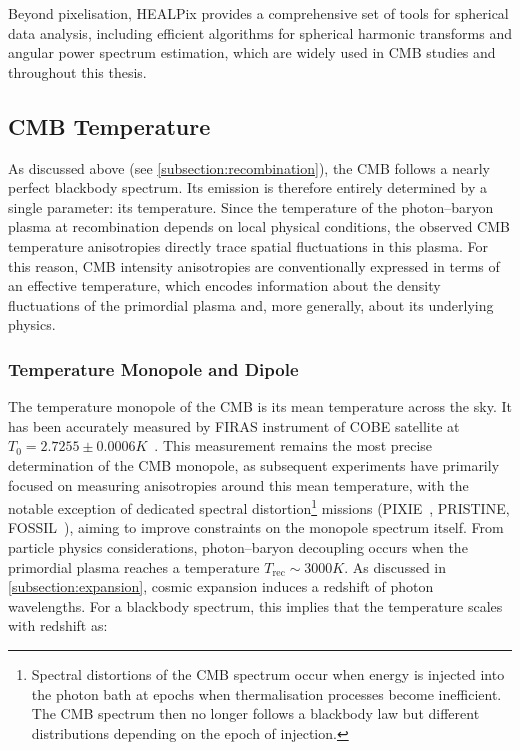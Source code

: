 \documentclass[../../thesis.tex]{subfiles}
\begin{document}
Beyond pixelisation, HEALPix provides a comprehensive set of tools for spherical data analysis, including efficient algorithms for spherical harmonic transforms and angular power spectrum estimation, which are widely used in CMB studies and throughout this thesis.

\subsection{CMB Temperature}

As discussed above (see \ref{subsection:recombination}), the CMB follows a nearly perfect blackbody spectrum. Its emission is therefore entirely determined by a single parameter: its temperature. Since the temperature of the photon–baryon plasma at recombination depends on local physical conditions, the observed CMB temperature anisotropies directly trace spatial fluctuations in this plasma. For this reason, CMB intensity anisotropies are conventionally expressed in terms of an effective temperature, which encodes information about the density fluctuations of the primordial plasma and, more generally, about its underlying physics.

\subsubsection{Temperature Monopole and Dipole} 

The temperature monopole of the CMB is its mean temperature across the sky. It has been accurately measured by FIRAS instrument of COBE satellite at $T_0 = 2.7255 \pm 0.0006 K$~\cite{COBE1994}. This measurement remains the most precise determination of the CMB monopole, as subsequent experiments have primarily focused on measuring anisotropies around this mean temperature, with the notable exception of dedicated spectral distortion\footnote{Spectral distortions of the CMB spectrum occur when energy is injected into the photon bath at epochs when thermalisation processes become inefficient. The CMB spectrum then no longer follows a blackbody law but different distributions depending on the epoch of injection.} missions (PIXIE~\cite{PIXIE2024}, PRISTINE, FOSSIL~\cite{FOSSIL2022}), aiming to improve constraints on the monopole spectrum itself. From particle physics considerations, photon–baryon decoupling occurs when the primordial plasma reaches a temperature $T_{\mathrm{rec}} \sim 3000 K$. As discussed in \ref{subsection:expansion}, cosmic expansion induces a redshift of photon wavelengths. For a blackbody spectrum, this implies that the temperature scales with redshift as:
\end{document}
